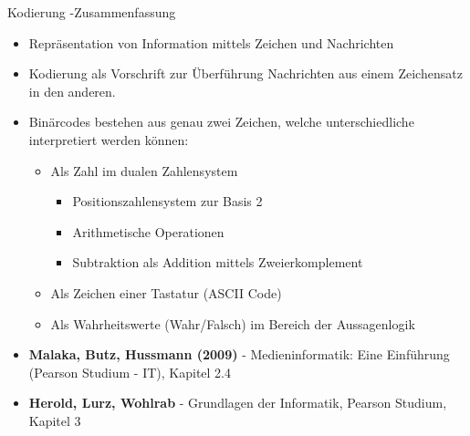 \begin{bsslide}[\textbufferB]
\end{bsslide}
\renewcommand{\textbufferB}{Kodierung -Zusammenfassung}
\begin{bsslide}
  \begin{center}
 \vspace{0.4\textheight}
    \large\textbufferB
  \end{center}
\end{bsslide}
\begin{bsslide}[Zusammenfassung]
  \begin{itemize}	
  \item Repr\"asentation von Information mittels Zeichen und Nachrichten
  \item Kodierung als Vorschrift zur \"Uberf\"uhrung Nachrichten
    aus einem Zeichensatz in den anderen. 
  \item Bin\"arcodes bestehen aus genau zwei Zeichen, welche
    unterschiedliche interpretiert werden k\"onnen:
    \begin{itemize}
    \item Als Zahl im dualen Zahlensystem
      \begin{itemize}
      \item Positionszahlensystem zur Basis 2
      \item Arithmetische Operationen
      \item Subtraktion als Addition mittels Zweierkomplement
      \end{itemize}
    \item Als Zeichen einer Tastatur (ASCII Code)
    \item Als Wahrheitswerte (Wahr/Falsch) im Bereich der Aussagenlogik
    \end{itemize}
  \end{itemize}
\end{bsslide}
\begin{bsslide}[Bibliographie]
  \begin{itemize}
  \item \textbf{Malaka, Butz, Hussmann (2009)} -
    Medieninformatik: Eine Einf\"uhrung (Pearson Studium - IT), Kapitel
    2.4
 \item \textbf{Herold, Lurz, Wohlrab} - Grundlagen der Informatik,
   Pearson Studium, Kapitel 3
  \end{itemize}
\end{bsslide}
